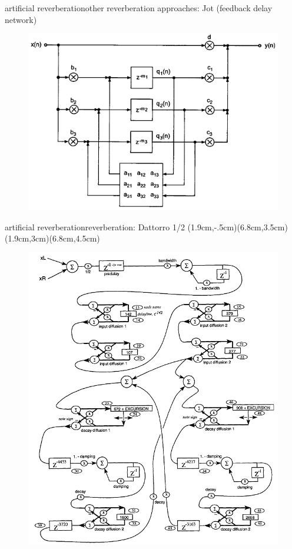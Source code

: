 \begin{frame}{artificial reverberation}{other reverberation approaches: Jot (feedback delay network)}
	\begin{figure}
		\centerline{\includegraphics[scale=.5]{graph/fdn}}
	\end{figure} 
\end{frame}

\begin{frame}{artificial reverberation}{reverberation: Dattorro 1/2}
	\vspace{-7mm}
    (1.9cm,-.5cm)(6.8cm,3.5cm)
    (1.9cm,3cm)(6.8cm,4.5cm)
    \begin{figure}
		\centerline{\includegraphics[scale=.37]{graph/dattorro}}
	\end{figure} 
\end{frame}

